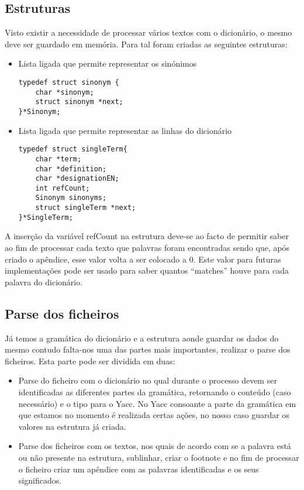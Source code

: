 \documentclass{llncs}
\begin{document}
\subsection{Estruturas}
Visto existir a necessidade de processar vários textos com o dicionário, o mesmo deve ser guardado em memória. Para tal foram criadas as seguintes estruturas:
\renewcommand{\labelitemi}{$\bullet$}
\begin{itemize}
\item Lista ligada que permite representar os sinónimos
\begin{lstlisting}
typedef struct sinonym {
    char *sinonym;
    struct sinonym *next;
}*Sinonym;
\end{lstlisting}
\item Lista ligada que permite representar as linhas do dicionário
\begin{lstlisting}
typedef struct singleTerm{
    char *term;
    char *definition;
    char *designationEN;
    int refCount;
    Sinonym sinonyms;
    struct singleTerm *next;
}*SingleTerm;
\end{lstlisting}
\end{itemize}
A inserção da variável refCount na estrutura deve-se ao facto de permitir saber ao fim de processar cada texto que palavras foram encontradas sendo que, após criado o apêndice, esse valor volta a ser colocado a 0. Este valor para futuras implementações pode ser usado para saber quantos ``matches'' houve para cada palavra do dicionário.

\subsection{Parse dos ficheiros}
Já temos a gramática do dicionário e a estrutura aonde guardar os dados do mesmo contudo falta-nos uma das partes mais importantes, realizar o parse dos ficheiros. Esta parte pode ser dividida em duas:
\begin{itemize}
\item Parse do ficheiro com o dicionário no qual durante o processo devem ser identificadas as diferentes partes da gramática, retornando o conteúdo (caso necessário) e o tipo para o Yacc. No Yacc consoante a parte da gramática em que estamos no momento é realizada certas ações, no nosso caso guardar os valores na estrutura já criada.
\item Parse dos ficheiros com os textos, nos quais de acordo com se a palavra está ou não presente na estrutura, sublinhar, criar o footnote e no fim de processar o ficheiro criar um apêndice com as palavras identificadas e os seus significados.
\end{itemize}
\end{document}
